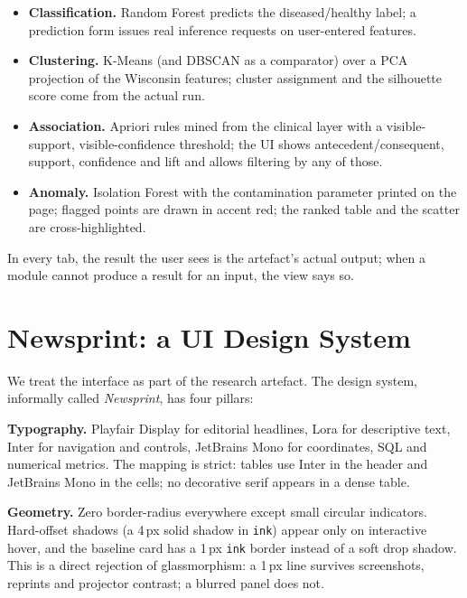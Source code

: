 \documentclass[conference,10pt]{IEEEtran}
\begin{document}
\begin{itemize}
  \item \textbf{Classification.} Random Forest predicts the diseased/healthy
        label; a prediction form issues real inference requests on
        user-entered features.
  \item \textbf{Clustering.} K-Means (and DBSCAN as a comparator) over
        a PCA projection of the Wisconsin features; cluster assignment
        and the silhouette score come from the actual run.
  \item \textbf{Association.} Apriori rules mined from the clinical
        layer with a visible-support, visible-confidence threshold; the
        UI shows antecedent/consequent, support, confidence and lift
        and allows filtering by any of those.
  \item \textbf{Anomaly.} Isolation Forest with the contamination
        parameter printed on the page; flagged points are drawn in
        accent red; the ranked table and the scatter are
        cross-highlighted.
\end{itemize}

In every tab, the result the user sees is the artefact's actual output;
when a module cannot produce a result for an input, the view says so.

\section{Newsprint: a UI Design System}
We treat the interface as part of the research artefact. The design
system, informally called \textit{Newsprint}, has four
pillars:

\textbf{Typography.} Playfair Display for editorial headlines, Lora
for descriptive text, Inter for navigation and controls, JetBrains Mono
for coordinates, SQL and numerical metrics. The mapping is strict:
tables use Inter in the header and JetBrains Mono in the cells; no
decorative serif appears in a dense table.

\textbf{Geometry.} Zero border-radius everywhere except small circular
indicators. Hard-offset shadows (a 4\,px solid shadow in \texttt{ink})
appear only on interactive hover, and the baseline card has a 1\,px
\texttt{ink} border instead of a soft drop shadow. This is a direct
rejection of glassmorphism: a 1\,px line survives screenshots,
reprints and projector contrast; a blurred panel does not.
\end{document}
